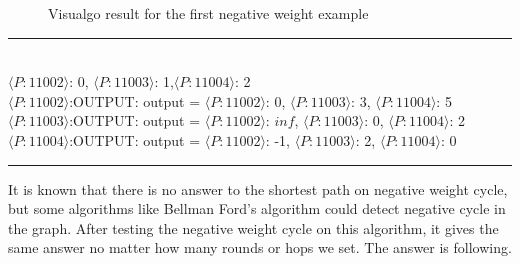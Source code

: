 \documentclass[11pt]{article}  %
\begin{document}
\begin{figure}[htbp]
\centering
{}
\quad
{}
\quad
{}
\caption{ Visualgo result for the first negative weight example}
\end{figure}\par

\noindent
\rule{5in}{.1pt}
\noindent \\
{$\langle P:11002\rangle $: 0, $\langle P:11003\rangle$: 1,$\langle P:11004\rangle$: 2}\\
$\langle P:11002\rangle$:OUTPUT: output = {$\langle P:11002\rangle$: 0, $\langle P:11003\rangle$: 3, $\langle P:11004\rangle$: 5}\\
$\langle P:11003\rangle$:OUTPUT: output = {$\langle P:11002\rangle$: $inf$, $\langle P:11003\rangle$: 0, $\langle P:11004\rangle$: 2}\\
$\langle P:11004\rangle$:OUTPUT: output = {$\langle P:11002\rangle$: -1, $\langle P:11003\rangle$: 2, $\langle P:11004\rangle$: 0}\\
\rule{5in}{.1pt}\par

It is known that there is no answer to the shortest path on negative weight cycle, but some algorithms like Bellman Ford's algorithm could detect negative cycle in the graph. After testing the negative weight cycle on this algorithm, it gives the same answer no matter how many rounds or hops we set. The answer is following.\par
\end{document}
